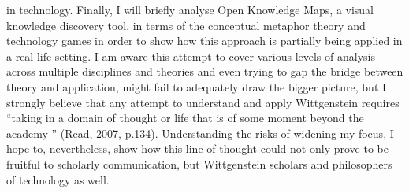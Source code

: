 in technology. Finally, I will briefly analyse Open Knowledge Maps, a
visual knowledge discovery tool, in terms of the conceptual
metaphor theory and technology games in order to show how this
approach is partially being applied in a real life setting. I am aware
this attempt to cover various levels of analysis across multiple
disciplines and theories and even trying to gap the bridge between
theory and application, might fail to adequately draw the bigger
picture, but I strongly believe that any attempt to understand and apply
Wittgenstein requires “taking in a domain of thought or life that is of
some moment beyond the academy ” (Read, 2007, p.134).
Understanding the risks of widening my focus, I hope to, nevertheless,
show how this line of thought could not only prove to be fruitful to
scholarly communication, but Wittgenstein scholars and philosophers of
technology as well.
